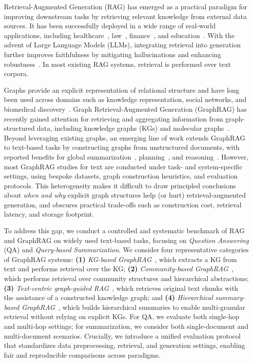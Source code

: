 Retrieval-Augmented Generation (RAG) has emerged as a practical paradigm for improving downstream tasks by retrieving relevant knowledge from external data sources. It has been successfully deployed in a wide range of real-world applications, including healthcare~\citep{xu2024ram}, law~\citep{wiratunga2024cbr}, finance~\citep{zhang2023enhancing}, and education~\citep{miladi2024leveraging}. With the advent of Large Language Models (LLMs), integrating retrieval into generation further improves faithfulness by mitigating hallucinations and enhancing robustness~\cite{zhao2023survey, huang2023survey}. In most existing RAG systems, retrieval is performed over text corpora.

Graphs provide an explicit representation of relational structure and have long been used across domains such as knowledge representation, social networks, and biomedical discovery~\cite{wu2020comprehensive, ma2021deep, wu2023survey}. Graph Retrieval-Augmented Generation (GraphRAG) has recently gained attention for retrieving and aggregating information from graph-structured data, including knowledge graphs (KGs) and molecular graphs~\citep{han2024retrieval, peng2024graph}. Beyond leveraging existing graphs, an emerging line of work extends GraphRAG to text-based tasks by constructing graphs from unstructured documents, with reported benefits for global summarization~\cite{edge2024local}, planning~\cite{lin2024graph}, and reasoning~\cite{han2025reasoning}. However, most GraphRAG studies for text are conducted under task- and system-specific settings, using bespoke datasets, graph construction heuristics, and evaluation protocols. This heterogeneity makes it difficult to draw principled conclusions about \textit{when and why} explicit graph structures help (or hurt) retrieval-augmented generation, and obscures practical trade-offs such as construction cost, retrieval latency, and storage footprint.

To address this gap, we conduct a controlled and systematic benchmark of RAG and GraphRAG on widely used text-based tasks, focusing on \textit{Question Answering} (QA) and \textit{Query-based Summarization}. We consider four representative categories of GraphRAG systems: 
{\bf (1)} \emph{KG-based GraphRAG}~\cite{Liu_LlamaIndex_2022}, which extracts a KG from text and performs retrieval over the KG; 
{\bf (2)} \emph{Community-based GraphRAG}~\citep{edge2024local}, which performs retrieval over community structures and hierarchical abstractions; 
{\bf (3)} \emph{Text-centric graph-guided RAG}~\citep{jimenez2024hipporag}, which retrieves original text chunks with the assistance of a constructed knowledge graph; and 
{\bf (4)} \emph{Hierarchical summary-based GraphRAG}~\citep{sarthi2024raptor}, which builds hierarchical summaries to enable multi-granular retrieval without relying on explicit KGs.
For QA, we evaluate both single-hop and multi-hop settings; for summarization, we consider both single-document and multi-document scenarios. Crucially, we introduce a unified evaluation protocol that standardizes data preprocessing, retrieval, and generation settings, enabling fair and reproducible comparisons across paradigms.


